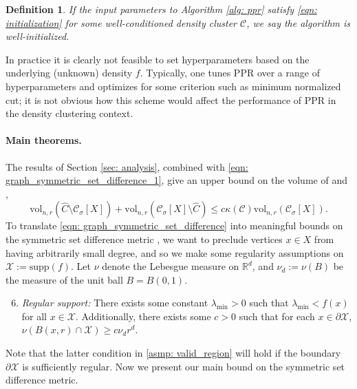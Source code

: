 \documentclass[11pt,twoside]{article}
\newtheorem{definition}{Definition}
\newcommand{\vol}{\mathrm{vol}}
\newcommand{\Reals}{\mathbb{R}}
\newcommand{\Rd}{\Reals^d}
\newcommand{\1}{\mathbf{1}}
\newcommand{\Xbf}{X}             %
\newcommand{\Cset}{\mathcal{C}}
\newcommand{\Csig}{\Cset_{\sigma}}
\newcommand{\Cest}{\widehat{C}}
\begin{document}
\begin{definition}
If the input parameters to Algorithm \ref{alg: ppr} satisfy \eqref{eqn:
  initialization} for some well-conditioned density cluster $\Cset$, we
say the algorithm is \emph{well-initialized}. 
\end{definition}

In practice it is clearly not feasible to set hyperparameters based on the
underlying (unknown) density $f$. Typically, one tunes PPR over a range of
hyperparameters and optimizes for some criterion such as minimum normalized cut;
it is not obvious how this scheme would affect the performance of PPR in the
density clustering context.  

\paragraph{Main theorems.} The results of Section \ref{sec: analysis}, combined 
with \eqref{eqn: graph_symmetric_set_difference_1}, give an upper bound on the
volume of \smash{$\Cest \setminus \Csig[\Xbf]$} and \smash{$\Csig[\Xbf]
  \setminus \Cest$},  
\begin{equation}
\label{eqn: graph_symmetric_set_difference}
\vol_{n,r}(\Cest \setminus \Csig[\Xbf]) + \vol_{n,r}(\Csig[\Xbf] \setminus
\Cest) \leq c \kappa(\Cset) \vol_{n,r}(\Csig[\Xbf]). 
\end{equation}
To translate \eqref{eqn: graph_symmetric_set_difference} into meaningful bounds
on the symmetric set difference metric \smash{$\Delta(\Csig[\Xbf], \Cest)$}, we
want to preclude vertices $x \in \Xbf$ from having arbitrarily small degree, and
so we make some regularity assumptions on $\mathcal{X} := \mathrm{supp}(f)$. Let
$\nu$ denote the Lebesgue measure on $\Rd$, and $\nu_d := \nu(B)$ be the measure
of the unit ball $B = B(0,1)$. 
\begin{enumerate}[label=(A\arabic*)]
  \setcounter{enumi}{5}
\item 
  \label{asmp: valid_region}
  \emph{Regular support:} There exists some constant $\lambda_{\min} > 0$ such 
  that $\lambda_{\min} < f(x)$ for all $x \in \mathcal{X}$. Additionally, there
  exists some $c > 0$ such that for each $x \in \partial \mathcal{X}$,
  $\nu(B(x,r) \cap \mathcal{X}) \geq c \nu_d r^d$. 
\end{enumerate}
Note that the latter condition in \ref{asmp: valid_region} will hold if the
boundary $\partial \mathcal{X}$ is sufficiently regular.  Now we present our
main bound on the symmetric set difference metric.
\end{document}
